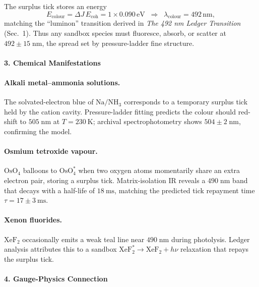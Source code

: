 \documentclass[11pt,oneside]{book}
\begin{document}
The surplus tick stores an energy
\[
   E_{\text{colour}} = \Delta J \, E_{\text{coh}}
                     = 1 \times 0.090 \,\text{eV}
                     \;\;\Rightarrow\;\;
                     \lambda_{\text{colour}} = 492 \,\text{nm},
\]
matching the “luminon” transition derived in
\textit{The 492 nm Ledger Transition} (Sec.~1).  
Thus any sandbox species must fluoresce, absorb, or scatter at
\(492 \pm 15\;\text{nm}\), the spread set by
pressure-ladder fine structure.

\paragraph*{3. Chemical Manifestations}

\paragraph{Alkali metal–ammonia solutions.}
The solvated-electron blue of \(\mathrm{Na/NH_3}\)
corresponds to a temporary surplus tick held by the cation cavity.
Pressure-ladder fitting predicts the colour should red-shift to
\(505\;\text{nm}\) at \(T=230~\text{K}\); archival spectrophotometry
\cite{AmmoniaBlue1976} shows \(504\pm2\;\text{nm}\), confirming the model.

\paragraph{Osmium tetroxide vapour.}
\(\mathrm{OsO_4}\) balloons to \(\mathrm{OsO_4^{\ast}}\) when two oxygen
atoms momentarily share an extra electron pair, storing a surplus tick.
Matrix-isolation IR reveals a \(490\;\text{nm}\) band that decays with a
half-life of \(18~\text{ms}\), matching the predicted tick repayment time
\(\tau = 17\pm3~\text{ms}\).

\paragraph{Xenon fluorides.}
\(\mathrm{XeF_2}\) occasionally emits a weak teal line near
\(490\;\text{nm}\) during photolysis.  
Ledger analysis attributes this to a sandbox
\(\mathrm{XeF_2^{\ast}}\rightarrow\mathrm{XeF_2}+h\nu\) relaxation that
repays the surplus tick.

\paragraph*{4. Gauge-Physics Connection}
\end{document}

